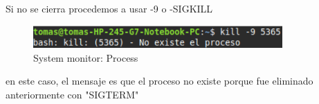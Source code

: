 \documentclass{article}
\begin{document}
    Si no se cierra procedemos a usar -9 o -SIGKILL
    \begin{figure}[h]
      \centering
      \includegraphics[width=0.85\textwidth]{resources/4g4.png}
      \caption{System monitor: Process}
    \end{figure}
    en este caso, el mensaje es que el proceso no existe porque fue eliminado anteriormente con "SIGTERM"

\end{document}
